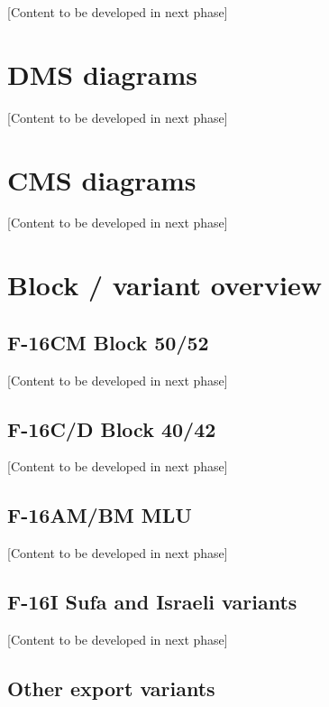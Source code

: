 \documentclass[11pt, a4paper, twoside]{report}
\begin{document}
[Content to be developed in next phase]

\section{DMS diagrams}
\label{sec:C7-S3}

[Content to be developed in next phase]

\section{CMS diagrams}
\label{sec:C7-S4}

[Content to be developed in next phase]

\appendix

\section{Block / variant overview}

\subsection{F-16CM Block 50/52}

[Content to be developed in next phase]

\subsection{F-16C/D Block 40/42}

[Content to be developed in next phase]

\subsection{F-16AM/BM MLU}

[Content to be developed in next phase]

\subsection{F-16I Sufa and Israeli variants}

[Content to be developed in next phase]

\subsection{Other export variants}
\end{document}
